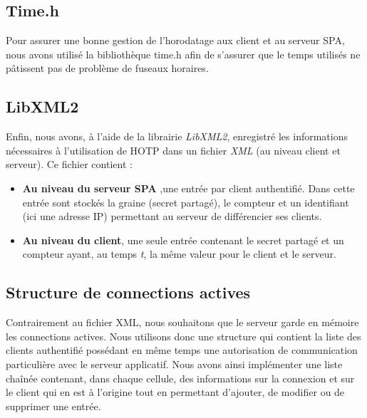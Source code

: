 \subsection{Time.h}
Pour assurer une bonne gestion de l'horodatage aux client et au serveur SPA, nous avons utilisé la bibliothèque time.h
 afin de s'assurer que le temps utilisés ne pâtissent pas de problème de fuseaux horaires.

\subsection{LibXML2}

Enfin, nous avons, à l'aide de la librairie \emph{LibXML2}, enregistré les informations nécessaires à l'utilisation de HOTP dans un fichier \emph{XML} (au niveau client et serveur).
Ce fichier contient :
\begin{itemize}
\item \textbf{Au niveau du serveur SPA} ,une entrée par client authentifié. Dans cette entrée sont stockés la graine (secret partagé), le compteur et un identifiant (ici une adresse IP) permettant au serveur de différencier ses clients.
\item \textbf{Au niveau du client}, une seule entrée contenant le secret partagé et un compteur ayant, au temps \emph{t}, la même valeur pour le client et le serveur.
\end{itemize}

\subsection{Structure de connections actives}

Contrairement au fichier XML, nous souhaitons que le serveur garde en mémoire les connections actives. Nous utilisons donc une structure qui contient la liste des clients authentifié possédant en même temps une autorisation de communication particulière avec le serveur applicatif. Nous avons ainsi implémenter une liste chaînée contenant, dans chaque cellule, des informations sur la connexion et sur le client qui en est à l'origine tout en permettant d'ajouter, de modifier ou de supprimer une entrée.
